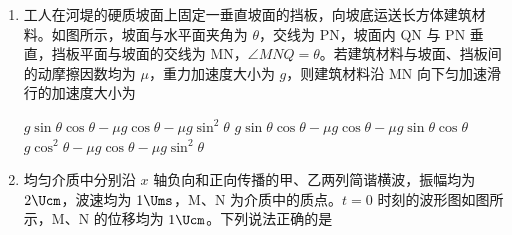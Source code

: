 \documentclass[\gkver]{gaokaozhenti}
\begin{document}
\begin{enumerate}

{$\frac{\sqrt{2}}{2}Blv$}
{$\frac{3}{2}Blv$}
{$\frac{\sqrt{10}}{4}Blv$}


\item
工人在河堤的硬质坡面上固定一垂直坡面的挡板，向坡底运送长方体建筑材料。如图所示，坡面与水平面夹角为 $\theta$，交线为 PN，坡面内 QN 与 PN 垂直，挡板平面与坡面的交线为 MN，$\angle MNQ = \theta$。若建筑材料与坡面、挡板间的动摩擦因数均为 $\mu$，重力加速度大小为 $g$，则建筑材料沿 MN 向下匀加速滑行的加速度大小为


{$g\sin\theta\cos\theta - \mu g\cos\theta - \mu g\sin^{2}\theta$}
{$g\sin\theta\cos\theta - \mu g\cos\theta - \mu g\sin\theta\cos\theta$}
{$g\cos^{2}\theta - \mu g\cos\theta - \mu g\sin^{2}\theta$}


\item
均匀介质中分别沿 $x$ 轴负向和正向传播的甲、乙两列简谐横波，振幅均为 $2 \Ucm$，波速均为 $1 \Ums$，M、N 为介质中的质点。$t = 0$ 时刻的波形图如图所示，M、N 的位移均为 $1 \Ucm$。下列说法正确的是


\end{enumerate}
\end{document}
